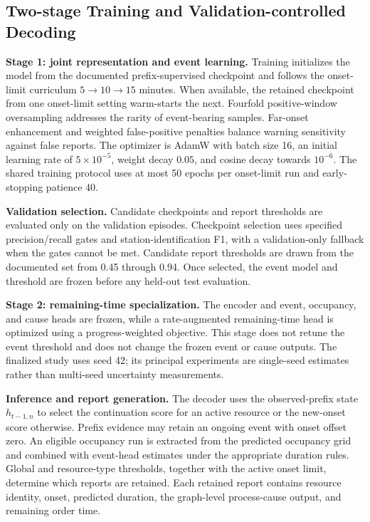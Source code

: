 \subsection{Two-stage Training and Validation-controlled Decoding}\label{two-stage-training-and-validation-controlled-decoding}

\textbf{Stage 1: joint representation and event learning.} Training initializes the model from the documented prefix-supervised checkpoint and follows the onset-limit curriculum \(5\rightarrow10\rightarrow15\) minutes. When available, the retained checkpoint from one onset-limit setting warm-starts the next. Fourfold positive-window oversampling addresses the rarity of event-bearing samples. Far-onset enhancement and weighted false-positive penalties balance warning sensitivity against false reports. The optimizer is AdamW with batch size 16, an initial learning rate of \(5\times10^{-5}\), weight decay \(0.05\), and cosine decay towards \(10^{-6}\). The shared training protocol uses at most 50 epochs per onset-limit run and early-stopping patience 40.

\textbf{Validation selection.} Candidate checkpoints and report thresholds are evaluated only on the validation episodes. Checkpoint selection uses specified precision/recall gates and station-identification F1, with a validation-only fallback when the gates cannot be met. Candidate report thresholds are drawn from the documented set from 0.45 through 0.94. Once selected, the event model and threshold are frozen before any held-out test evaluation.

\textbf{Stage 2: remaining-time specialization.} The encoder and event, occupancy, and cause heads are frozen, while a rate-augmented remaining-time head is optimized using a progress-weighted objective. This stage does not retune the event threshold and does not change the frozen event or cause outputs. The finalized study uses seed 42; its principal experiments are single-seed estimates rather than multi-seed uncertainty measurements.

\textbf{Inference and report generation.} The decoder uses the observed-prefix state \(h_{t-1,n}\) to select the continuation score for an active resource or the new-onset score otherwise. Prefix evidence may retain an ongoing event with onset offset zero. An eligible occupancy run is extracted from the predicted occupancy grid and combined with event-head estimates under the appropriate duration rules. Global and resource-type thresholds, together with the active onset limit, determine which reports are retained. Each retained report contains resource identity, onset, predicted duration, the graph-level process-cause output, and remaining order time.

